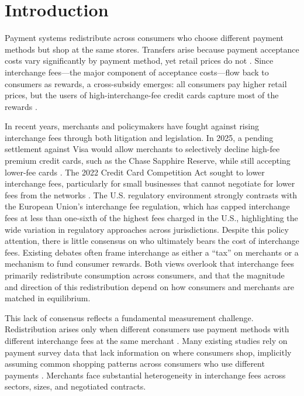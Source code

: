 \documentclass[main.tex]{subfiles}
\begin{document}
\section{Introduction}

Payment systems redistribute across consumers who choose different payment methods but shop at the same stores.
Transfers arise because payment acceptance costs vary significantly by payment method, yet retail prices do not \citep{Stavins2018}.
Since interchange fees---the major component of acceptance costs---flow back to consumers as rewards, a cross-subsidy emerges: all consumers pay higher retail prices, but the users of high-interchange-fee credit cards capture most of the rewards \citep{carlton1994antitrust}.

In recent years, merchants and policymakers have fought against rising interchange fees through both litigation and legislation.
In 2025, a pending settlement against Visa would allow merchants to selectively decline high-fee premium credit cards, such as the Chase Sapphire Reserve, while still accepting lower-fee cards \citep{Andriotis2025}.
The 2022 Credit Card Competition Act sought to lower interchange fees, particularly for small businesses that cannot negotiate for lower fees from the networks \citep{Andriotis2022}.
The U.S. regulatory environment strongly contrasts with the European Union's interchange fee regulation, which has capped interchange fees at less than one-sixth of the highest fees charged in the U.S., highlighting the wide variation in regulatory approaches across jurisdictions.
Despite this policy attention, there is little consensus on who ultimately bears the cost of interchange fees. Existing debates often frame interchange as either a ``tax'' on merchants or a mechanism to fund consumer rewards. Both views overlook that interchange fees primarily redistribute consumption across consumers, and that the magnitude and direction of this redistribution depend on how consumers and merchants are matched in equilibrium.

This lack of consensus reflects a fundamental measurement challenge. 
Redistribution arises only when different consumers use payment methods with different interchange fees at the same merchant \citep{Gans2018}.
Many existing studies rely on payment survey data that lack information on where consumers shop, implicitly assuming common shopping patterns across consumers who use different payments \citep{Felt.etal2023}.
Merchants face substantial heterogeneity in interchange fees across sectors, sizes, and negotiated contracts.
\end{document}

